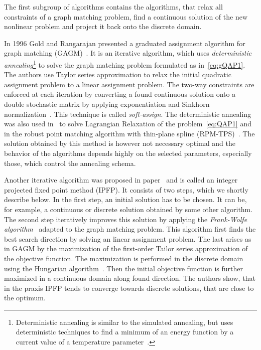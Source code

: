 The first subgroup of algorithms contains the algorithms, that relax all constraints of a graph matching problem, find a continuous solution of the new nonlinear problem and project it back onto the discrete domain. 

In 1996 Gold and Rangarajan presented a graduated assignment algorithm for graph matching (GAGM)~\cite{Rangarajan1996_GAGM}. It is an iterative algorithm, which uses \emph{deterministic annealing}\footnote{Deterministic annealing is similar to the simulated annealing, but uses deterministic techniques to find a minimum of an energy function by a current value of a temperature parameter~\cite{Rose1991_DA}.} to solve the graph matching problem formulated as in~\eqref{eq:gQAP1}. The authors use Taylor series approximation to relax the initial quadratic assignment problem to a linear assignment problem. The two-way constraints are enforced at each iteration by converting a  found continuous solution onto a double stochastic matrix by applying exponentiation and Sinkhorn normalization~\cite{Sinkhorn1964}. This technique is called \emph{soft-assign}. The deterministic annealing was also used in~\cite{Rangarajan96_LagRelax} to solve Lagrangian Relaxation of the problem~\eqref{eq:QAP1} and in the robust point matching algorithm with thin-plane spline (RPM-TPS)~\cite{Chui2003}. The solution obtained by this method is however not necessary optimal and the behavior of the algorithms depends highly on the selected parameters, especially those, which control the annealing schema.

Another iterative algorithm was proposed in paper~\cite{Leordeanu2009_IPFP} and is called an integer projected fixed point method (IPFP). It consists of two steps, which we shortly describe below. In the first step, an initial solution has to be chosen. It can be, for example, a continuous or discrete solution obtained by some other algorithm. The second step iteratively improves this solution by applying the \emph{Frank-Wolfe algorithm}~\cite{Wolfe1956} adapted to the graph matching problem. This algorithm first finds the best search direction by solving an linear assignment problem. The last arises as in GAGM by the maximization of the first-order Tailor series approximation of the objective function. The maximization is performed in the discrete domain using the Hungarian algorithm~\cite{Kuhn1955}. Then the initial objective function is further maximized in a continuous domain along found direction. The authors show, that in the praxis IPFP tends to converge towards discrete solutions, that are close to the optimum.

